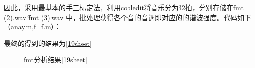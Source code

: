 \documentclass{ctexart}
\begin{document}
\begin{enumerate}
        因此，采用最基本的手工标定法，利用cooledit将音乐分为32拍，分别存储在fmt (2).wav \~ fmt (3).wav 中，批处理获得各个音的音调即对应的的谐波强度。代码如下（anay.m,f\_f.m）：
        
        
        最终的得到的结果为\ref{19sheet}
        \begin{figure}
            \centering
            \caption{fmt分析结果\ref{19sheet}}
        \end{figure}

\end{enumerate}
\end{document}
